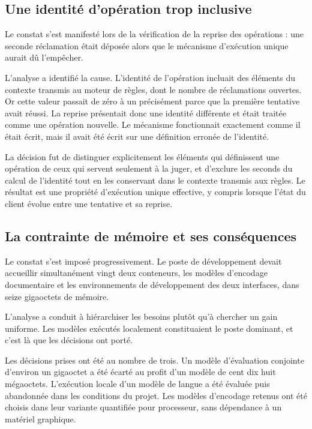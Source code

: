 \subsection{Une identité d'opération trop inclusive}

Le constat s'est manifesté lors de la vérification de la reprise des opérations : une seconde réclamation était déposée alors que le mécanisme d'exécution unique aurait dû l'empêcher.

L'analyse a identifié la cause. L'identité de l'opération incluait des éléments du contexte transmis au moteur de règles, dont le nombre de réclamations ouvertes. Or cette valeur passait de zéro à un précisément parce que la première tentative avait réussi. La reprise présentait donc une identité différente et était traitée comme une opération nouvelle. Le mécanisme fonctionnait exactement comme il était écrit, mais il avait été écrit sur une définition erronée de l'identité.

La décision fut de distinguer explicitement les éléments qui définissent une opération de ceux qui servent seulement à la juger, et d'exclure les seconds du calcul de l'identité tout en les conservant dans le contexte transmis aux règles. Le résultat est une propriété d'exécution unique effective, y compris lorsque l'état du client évolue entre une tentative et sa reprise.

\subsection{La contrainte de mémoire et ses conséquences}

Le constat s'est imposé progressivement. Le poste de développement devait accueillir simultanément vingt deux conteneurs, les modèles d'encodage documentaire et les environnements de développement des deux interfaces, dans seize gigaoctets de mémoire.

L'analyse a conduit à hiérarchiser les besoins plutôt qu'à chercher un gain uniforme. Les modèles exécutés localement constituaient le poste dominant, et c'est là que les décisions ont porté.

Les décisions prises ont été au nombre de trois. Un modèle d'évaluation conjointe d'environ un gigaoctet a été écarté au profit d'un modèle de cent dix huit mégaoctets. L'exécution locale d'un modèle de langue a été évaluée puis abandonnée dans les conditions du projet. Les modèles d'encodage retenus ont été choisis dans leur variante quantifiée pour processeur, sans dépendance à un matériel graphique.

